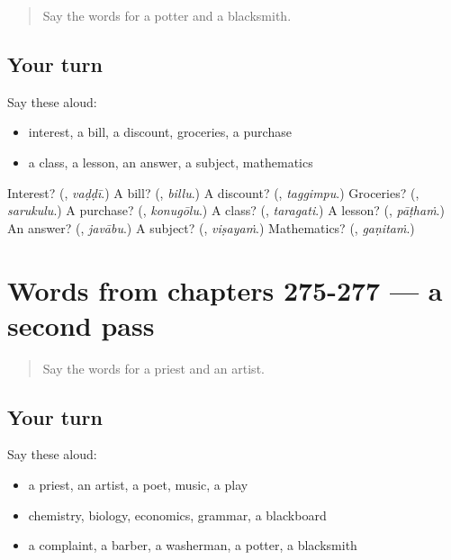 \begin{quote}
Say the words for a potter and a blacksmith.
\end{quote}

\subsection*{Your turn}
Say these aloud:

\begin{itemize}
\raggedright
  \item interest, a bill, a discount, groceries, a purchase
  \item a class, a lesson, an answer, a subject, mathematics
\end{itemize}

\begin{tcolorbox}[breakable,colback=teal!4,colframe=teal!35!black,title={Before you move on}]
Interest? (\textbf{}, \emph{vaḍḍī}.) A bill? (\textbf{}, \emph{billu}.) A discount? (\textbf{}, \emph{taggimpu}.) Groceries? (\textbf{}, \emph{sarukulu}.) A purchase? (\textbf{}, \emph{konugōlu}.) A class? (\textbf{}, \emph{taragati}.) A lesson? (\textbf{}, \emph{pāṭhaṁ}.) An answer? (\textbf{}, \emph{javābu}.) A subject? (\textbf{}, \emph{viṣayaṁ}.) Mathematics? (\textbf{}, \emph{gaṇitaṁ}.)
\end{tcolorbox}
\section[(dialogue)]{Words from chapters 275-277 — a second pass}

\label{lesson:TE-R277-second-pass-words-from-chapters-275-277}



\begin{quote}
Say the words for a priest and an artist.
\end{quote}

\subsection*{Your turn}
Say these aloud:

\begin{itemize}
\raggedright
  \item a priest, an artist, a poet, music, a play
  \item chemistry, biology, economics, grammar, a blackboard
  \item a complaint, a barber, a washerman, a potter, a blacksmith
\end{itemize}

